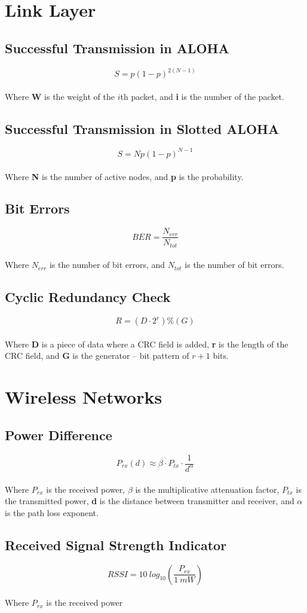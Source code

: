 \documentclass{article}
\begin{document}
\section{Link Layer}
\subsection{Successful Transmission in ALOHA}
\vspace{.3cm}
\[ S = p(1-p)^{2(N-1)} \] \\
Where \textbf{W} is the weight of the $i$th packet, and \textbf{i} is the number of the packet.

\subsection{Successful Transmission in Slotted ALOHA}
\vspace{.3cm}
\[ S = Np(1-p)^{N-1} \] \\
Where \textbf{N} is the number of active nodes, and \textbf{p} is the probability.

\subsection{Bit Errors}
\vspace{.3cm}
\[ BER = \frac{N_{err}}{N_{tot}} \] \\
Where $N_{err}$ is the number of bit errors, and $N_{tot}$ is the number of bit errors.

\subsection{Cyclic Redundancy Check}
\vspace{.3cm}
\[ R = (D \cdot 2^r) \% (G) \] \\
Where \textbf{D} is a piece of data where a CRC field is added, \textbf{r} is the length of the CRC field, and \textbf{G} is the generator -- bit pattern of $r + 1$ bits.

\section{Wireless Networks}
\subsection{Power Difference}
\vspace{.3cm}
\[ P_{rx}(d) \approx \beta \cdot P_{tx} \cdot \frac{1}{d^\alpha} \] \\
Where $P_{rx}$ is the received power, $\beta$ is the multiplicative attenuation factor, $P_{tx}$ is the transmitted power, \textbf{d} is the distance between transmitter and receiver, and $\alpha$ is the path loss exponent.

\subsection{Received Signal Strength Indicator}
\vspace{.3cm}
\[ RSSI = 10~log_{10}\left(\frac{P_{rx}}{1~mW}\right) \] \\
Where $P_{rx}$ is the received power
\end{document}
